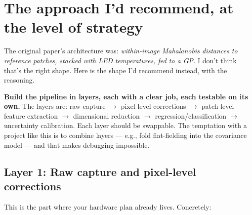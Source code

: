\documentclass[11pt,letterpaper]{article}
\begin{document}
\section*{The approach I'd recommend, at the level of strategy}

The original paper's architecture was: \emph{within-image Mahalanobis
distances to reference patches, stacked with LED temperatures, fed to a GP.}
I don't think that's the right shape. Here is the shape I'd recommend
instead, with the reasoning.

\textbf{Build the pipeline in layers, each with a clear job, each testable on
its own.} The layers are: raw capture $\to$ pixel-level corrections $\to$
patch-level feature extraction $\to$ dimensional reduction $\to$
regression/classification $\to$ uncertainty calibration. Each layer should
be swappable. The temptation with a project like this is to combine layers
--- e.g., fold flat-fielding into the covariance model --- and that makes
debugging impossible.

\subsection*{Layer 1: Raw capture and pixel-level corrections}

This is the part where your hardware plan already lives. Concretely:
\end{document}
